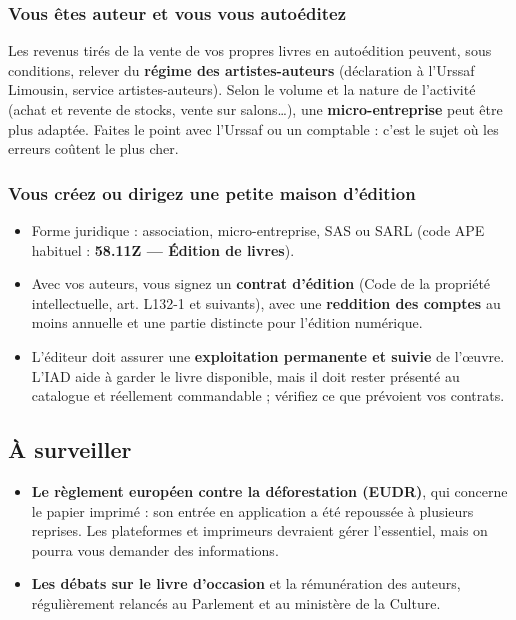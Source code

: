 \subsubsection{Vous êtes auteur et vous vous autoéditez}

Les revenus tirés de la vente de vos propres livres en autoédition
peuvent, sous conditions, relever du \textbf{régime des
artistes-auteurs} (déclaration à l’Urssaf Limousin, service
artistes-auteurs). Selon le volume et la nature de l’activité (achat et
revente de stocks, vente sur salons…), une \textbf{micro-entreprise}
peut être plus adaptée. Faites le point avec l’Urssaf ou un comptable :
c’est le sujet où les erreurs coûtent le plus cher.

\subsubsection{Vous créez ou dirigez une petite maison d’édition}

\begin{itemize}
  \item Forme juridique : association, micro-entreprise, SAS ou SARL
        (code APE habituel : \textbf{58.11Z — Édition de livres}).
  \item Avec vos auteurs, vous signez un \textbf{contrat d’édition}
        (Code de la propriété intellectuelle, art. L132-1 et suivants),
        avec une \textbf{reddition des comptes} au moins annuelle et une
        partie distincte pour l’édition numérique.
  \item L’éditeur doit assurer une \textbf{exploitation permanente et
        suivie} de l’œuvre. L’IAD aide à garder le livre disponible,
        mais il doit rester présenté au catalogue et réellement
        commandable ; vérifiez ce que prévoient vos contrats.
\end{itemize}

\subsection{À surveiller}

\begin{itemize}
  \item \textbf{Le règlement européen contre la déforestation (EUDR)},
        qui concerne le papier imprimé : son entrée en application a été
        repoussée à plusieurs reprises. Les plateformes et imprimeurs
        devraient gérer l’essentiel, mais on pourra vous demander des
        informations.
  \item \textbf{Les débats sur le livre d’occasion} et la rémunération
        des auteurs, régulièrement relancés au Parlement et au ministère
        de la Culture.
\end{itemize}

